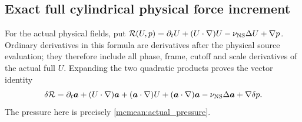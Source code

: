 \documentclass[11pt]{article}
\begin{document}
\subsection{Exact full cylindrical physical force increment}

For the actual physical fields, put
\(\mathcal R(U,p)=\partial_tU+(U\cdot\nabla)U
-\nu_{\rm NS}\Delta U+\nabla p\). Ordinary derivatives in this
formula are derivatives after the physical source evaluation; they
therefore include all phase, frame, cutoff and scale derivatives of
the actual full \(U\). Expanding the two quadratic products proves
the vector identity
\begin{equation}\label{mcmean:vector_force}
 \delta\mathcal R=\partial_t\boldsymbol a
 +(U\cdot\nabla)\boldsymbol a+(\boldsymbol a\cdot\nabla)U
 +(\boldsymbol a\cdot\nabla)\boldsymbol a
 -\nu_{\rm NS}\Delta\boldsymbol a+\nabla\delta p.
\end{equation}
The pressure here is precisely \eqref{mcmean:actual_pressure}.
\end{document}
